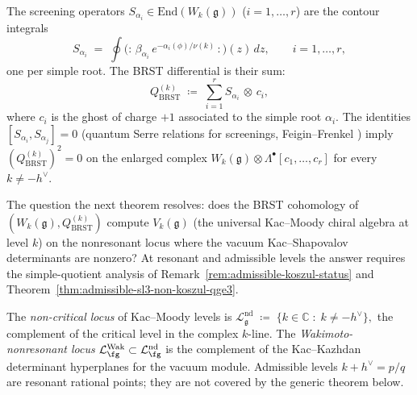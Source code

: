 The screening operators
$S_{\alpha_i}\in\mathrm{End}(W_k(\mathfrak{g}))$ ($i=1,\ldots,r$) are
the contour integrals
\begin{equation}
\label{eq:wakimoto-screenings}
S_{\alpha_i}
\;=\;
\oint \bigl({:}\,\beta_{\alpha_i}\,e^{-\alpha_i(\phi)/\nu(k)}\,{:}\bigr)(z)\,dz,
\qquad i=1,\ldots,r,
\end{equation}
one per simple root. The BRST differential is their sum:
\begin{equation}
\label{eq:wakimoto-brst}
Q_{\mathrm{BRST}}^{(k)}
\;\coloneqq\;
\sum_{i=1}^{r} S_{\alpha_i}\,\otimes\,c_i,
\end{equation}
where $c_i$ is the ghost of charge $+1$ associated to the simple root
$\alpha_i$. The identities $[S_{\alpha_i},S_{\alpha_j}]=0$ (quantum
Serre relations for screenings, Feigin--Frenkel
\cite{FeiginFrenkel90bosonization}) imply
$(Q_{\mathrm{BRST}}^{(k)})^2 = 0$ on the enlarged complex
$W_k(\mathfrak{g})\otimes\Lambda^\bullet[c_1,\ldots,c_r]$ for every
$k\ne -h^\vee$.

The question the next theorem resolves: does the BRST cohomology of
$(W_k(\mathfrak{g}),Q_{\mathrm{BRST}}^{(k)})$ compute
$V_k(\mathfrak{g})$ (the universal Kac--Moody chiral algebra at
level $k$) on the nonresonant locus where the vacuum
Kac--Shapovalov determinants are nonzero? At resonant and admissible
levels the answer requires the simple-quotient analysis of
Remark~\ref{rem:admissible-koszul-status} and
Theorem~\ref{thm:admissible-sl3-non-koszul-qge3}.

\begin{definition}
\label{def:wakimoto-nondegenerate-locus}
The \emph{non-critical locus} of Kac--Moody levels is
\(
\mathcal{L}^{\mathrm{nd}}_{\mathfrak{g}}
\;\coloneqq\;\{k\in\mathbb{C}\;:\;k\ne -h^\vee\},
\)
the complement of the critical level in the complex $k$-line. The
\emph{Wakimoto-nonresonant locus}
\(\mathcal L^{\mathrm{Wak}}_{\fg}\subset\mathcal L^{\mathrm{nd}}_{\fg}\)
is the complement of the Kac--Kazhdan determinant hyperplanes for the
vacuum module. Admissible levels $k+h^\vee=p/q$ are resonant
rational points; they are not covered by the generic theorem below.
\end{definition}

